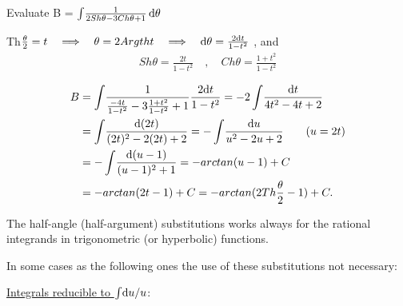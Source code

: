 \documentclass[11pt]{amsbook}
\begin{document}
\begin{exmp}


Evaluate B = $\int \! \frac{1}{2Sh\theta - 3Ch\theta +1} \, \mathrm{d} \theta $\\
\begin{hSolution}
Th$\frac{\theta}{2}=t\quad\Longrightarrow
\quad\theta =2Argtht\quad\Longrightarrow
\quad\mathrm{d} \theta =\frac{2\mathrm{d} t}{1-t^{2}}$ , and\\
\begin{align*}
Sh\theta=\frac{2t}{1-t^{2}}\quad , \quad Ch\theta=\frac{1+t^{2}}{1-t^{2}}\\
\end{align*}
\begin{align*}
B
&=\int \! \frac{1}{\frac{-4t}{1-t^{2}}-3\frac{1+t^{2}}{1-t^{2}}+1}\frac{2\mathrm{d} t}{1-t^{2}}=-2 \int \! \frac{\mathrm{d} t}{4t^{2}-4t+2}\\
&=\int \! \frac{\mathrm{d} (2t)}{(2t)^{2}-2(2t)+2}=-\int \! \frac{\mathrm{d} u}{u^{2}-2u+2} \qquad (u=2t)\\
&=-\int \! \frac{\mathrm{d} (u-1)}{(u-1)^{2}+1}=-arctan(u-1)+C\\
&=-arctan(2t-1)+C=-arctan(2Th\frac{\theta}{2}-1)+C.\\
\end{align*}
\end{hSolution}
\end{exmp}
\par The half-angle (half-argument) substitutions works always for the rational integrands in trigonometric (or hyperbolic) functions.\\
\par In some cases as the following ones the use of these substitutions not necessary:\\
\par \underline{Integrals reducible to $\int \! \mathrm{d}  u /u$}:\\
\end{document}
